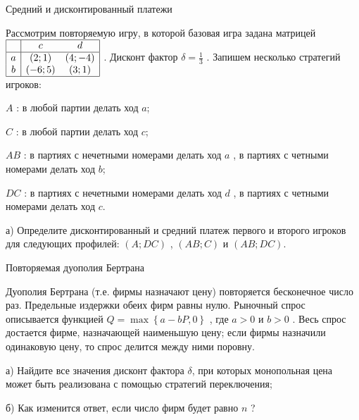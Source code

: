\begin{problem}
 Средний и дисконтированный платежи

Рассмотрим повторяемую игру, в которой базовая игра задана матрицей  $\begin{array}{|c|cc|}  \hline {} & {c} & {d} \\  \hline {a} & {\left(2;1\right)} & {\left(4;-4\right)} \\ {b} & {\left(-6;5\right)} & {\left(3;1\right)} \\  \hline  \end{array}$ . Дисконт фактор  $\delta =\frac{1}{3} $ .
Запишем несколько стратегий игроков:\par
 $A$ : в любой партии делать ход  $a$;\par
 $C$ : в любой партии делать ход  $c$;\par
 $AB$ : в партиях с нечетными номерами делать ход  $a$ , в партиях с четными номерами делать ход  $b$;\par
 $DC$ : в партиях с нечетными номерами делать ход  $d$ , в партиях с четными номерами делать ход  $c$.\par
а)      Определите дисконтированный и средний платеж первого и второго игроков для следующих профилей:  $\left(A;DC\right)$ ,  $\left(AB;C\right)$  и  $\left(AB;DC\right)$.



\begin{sol}

\end{sol}
\end{problem}



\begin{problem}
 Повторяемая дуополия Бертрана

Дуополия Бертрана (т.е. фирмы назначают цену) повторяется бесконечное число раз. Предельные издержки обеих фирм равны нулю. Рыночный спрос описывается функцией  $Q=\max \left\{a-bP,0\right\}$ , где  $a>0$  и  $b>0$ . Весь спрос достается фирме, назначающей наименьшую цену; если фирмы назначили одинаковую цену, то спрос делится между ними поровну.

а) Найдите все значения дисконт фактора  $\delta $, при которых монопольная цена может быть реализована с помощью стратегий переключения;

б) Как изменится ответ, если число фирм будет равно $n$ ?



\begin{sol}

\end{sol}
\end{problem}



